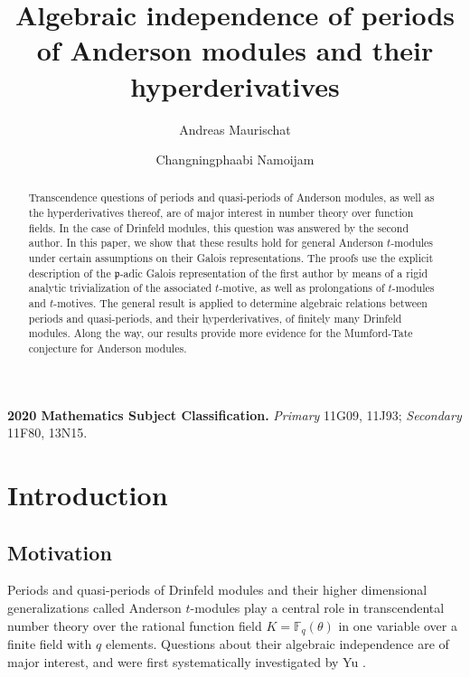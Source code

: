 \documentclass[10pt,a4paper]{amsart}
\title{Algebraic independence of periods of Anderson modules and their hyperderivatives}
\author{Andreas Maurischat}
\author{Changningphaabi Namoijam}
\date{\displaydate{date}}
\theoremstyle{plain} %
\theoremstyle{definition}
\theoremstyle{remark}
\newcommand{\FF}{\mathbb{F}}
\newcommand{\fp}{\mathfrak{p}}  %
\newcommand{\Fq}{\FF_{\!q}}  %
\numberwithin{equation}{subsection}
\begin{document}
\begin{abstract} 
Transcendence questions of periods and quasi-periods of Anderson modules, as well as the hyperderivatives thereof, are of major interest in number theory over function fields.
In the case of Drinfeld modules, this question was answered by the second author.
In this paper, we show that these results hold for general Anderson $t$-modules under certain assumptions on their Galois representations.
The proofs use the explicit
description of the $\fp$-adic Galois representation of the first author by means of a rigid analytic
trivialization of the associated $t$-motive, as well as prolongations of $t$-modules and $t$-motives. The
general result is applied to determine algebraic relations between periods and quasi-periods, and their
hyperderivatives, of finitely many Drinfeld modules.
Along the way, our results provide more evidence for the Mumford-Tate conjecture for Anderson modules.
\end{abstract}

\maketitle
    
{\footnotesize {\bf 2020 Mathematics Subject Classification.} {\it Primary} 11G09, 11J93; {\it Secondary} 11F80, 13N15.}


\setcounter{tocdepth}{1}
\tableofcontents





\section{Introduction}



\subsection{Motivation} 
Periods and quasi-periods of Drinfeld modules and their higher dimensional generalizations called Anderson $t$-modules play a central role in transcendental number theory over the rational function field $K = \Fq (\theta)$ in one variable over a finite field with $q$ elements. Questions about their algebraic independence are of major interest, and were first systematically investigated by Yu \cite{jy:ttoff, jy:tadm, jy:tadmsv, jy:opaqpodm, jy:taszvicp, jy:ahdm}.
\end{document}
